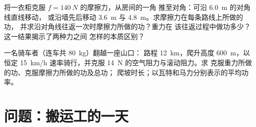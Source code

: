 \begin{exercise}[$\star\star\star$]\label{exo:g11:work-of-force:14}
将一衣柜克服 $f = \qty{140}{N}$ 的摩擦力，从房间的一角
推至对角：可沿 \qty{6.0}{m} 的对角线直线移动，
或沿墙先后移动 \qty{3.6}{m} 与 \qty{4.8}{m}。求摩擦力在每条路线上所做的功，
并求沿对角线往返一次时摩擦力所做的功？重力在
该往返过程中做功多少？这一结果揭示了两种力之间
怎样的本质区别？
\end{exercise}

\begin{exercise}[$\star\star\star$]\label{exo:g11:work-of-force:15}
一名骑车者（连车共 \qty{80}{kg}）翻越一座山口：
路程 \qty{12}{km}，爬升高度 \qty{600}{m}，以恒定 \qty{15}{km/h}
速率骑行，并克服 \qty{14}{N} 的空气阻力与滚动阻力。求
克服重力所做的功、克服摩擦力所做的功及总功；
爬坡时长；以瓦特和马力分别表示的平均功率。
\end{exercise}

\section{问题：搬运工的一天}

